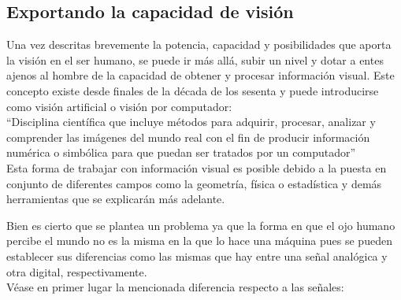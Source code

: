 \subsection{Exportando la capacidad de visión}

Una vez descritas brevemente la potencia, capacidad y posibilidades que aporta la visión en el ser humano, se puede ir más allá, subir un nivel y dotar a entes ajenos al hombre de la capacidad de obtener y procesar información visual. Este concepto existe desde finales de la década de los sesenta y puede introducirse como visión artificial o visión por computador: 
\\
“Disciplina científica que incluye métodos para adquirir, procesar, analizar y comprender las imágenes del mundo real con el fin de producir información numérica o simbólica para que puedan ser tratados por un computador”
\\
Esta forma de trabajar con información visual es posible debido a la puesta en conjunto de diferentes campos como la geometría, física o estadística y demás herramientas que se explicarán más adelante.

Bien es cierto que se plantea un problema ya que la forma en que el ojo humano percibe el mundo no es la misma en la que lo hace una máquina pues se pueden establecer sus diferencias como las mismas que hay entre una señal analógica y otra digital, respectivamente.
\\
Véase en primer lugar la mencionada diferencia respecto a las señales:

